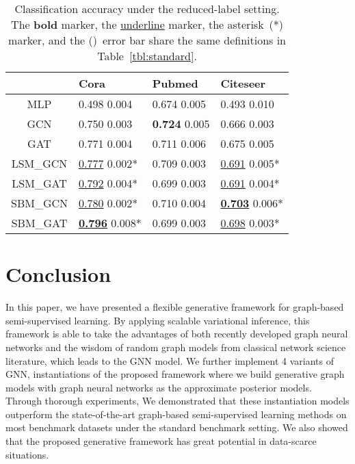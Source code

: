 \documentclass{article}
\begin{document}
\begin{table}[tb]
\centering
\caption{Classification accuracy under the reduced-label setting. The \textbf{bold} marker, the \underline{underline} marker, the asterisk~(*) marker, and the ()~error bar share the same definitions in Table~\ref{tbl:standard}.}
\label{tbl:reduced}
\begin{tabular}{clll}
\toprule
{} &                                            Cora &                              Pubmed &                                        Citeseer \\
\midrule
MLP     &                       0.498  \small{0.004} &           0.674  \small{0.005} &                       0.493  \small{0.010} \\
GCN     &                       0.750  \small{0.003} &  \textbf{0.724}  \small{0.005} &                       0.666  \small{0.003} \\
GAT     &                       0.771  \small{0.004} &           0.711  \small{0.006} &                       0.675  \small{0.005} \\
\hline
LSM\_GCN &           \underline{0.777}  \small{0.002}* &           0.709  \small{0.003} &           \underline{0.691}  \small{0.005}* \\
LSM\_GAT &           \underline{0.792}  \small{0.004}* &           0.699  \small{0.003} &           \underline{0.691}  \small{0.004}* \\
SBM\_GCN &           \underline{0.780}  \small{0.002}* &           0.710  \small{0.004} &  \underline{\textbf{0.703}}  \small{0.006}* \\
SBM\_GAT &  \underline{\textbf{0.796}}  \small{0.008}* &           0.699  \small{0.003} &           \underline{0.698}  \small{0.003}* \\
\bottomrule
\end{tabular}
\end{table}

 \section{Conclusion}
\label{sec:conclusion}

In this paper, we have presented a flexible generative framework for graph-based semi-supervised learning. By applying scalable variational inference, this framework is able to take the advantages of both recently developed graph neural networks and the wisdom of random graph models from classical network science literature, which leads to the GNN model. We further implement 4 variants of GNN, instantiations of the proposed framework where we build generative graph models with graph neural networks as the approximate posterior models. Through thorough experiments, We demonstrated that these instantiation models outperform the state-of-the-art graph-based semi-supervised learning methods on most benchmark datasets under the standard benchmark setting. We also showed that the proposed generative framework has great potential in data-scarce situations. 
\end{document}
